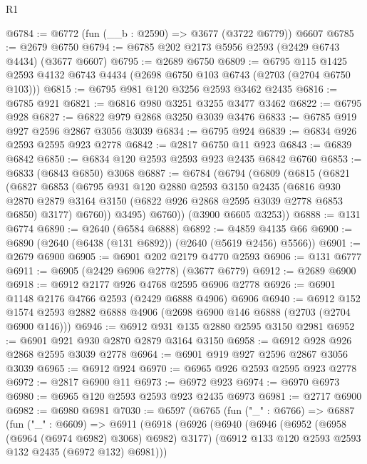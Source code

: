 \begin{lexlean}{R1}
\begin{coremodule}
@6784 := @6772 (fun (__b : @2590) => @3677 (@3722 @6779)) @6607
@6785 := @2679 @6750
@6794 := @6785 @202 @2173 @5956 @2593 (@2429 @6743 @4434) (@3677 @6607)
@6795 := @2689 @6750
@6809 := @6795
    @115
    @1425
    @2593
    @4132
    @6743
    @4434
    (@2698 @6750 @103 @6743 (@2703 (@2704 @6750 @103)))
@6815 := @6795 @981 @120 @3256 @2593 @3462 @2435
@6816 := @6785 @921
@6821 := @6816 @980 @3251 @3255 @3477 @3462
@6822 := @6795 @928
@6827 := @6822 @979 @2868 @3250 @3039 @3476
@6833 := @6785 @919 @927 @2596 @2867 @3056 @3039
@6834 := @6795 @924
@6839 := @6834 @926 @2593 @2595 @923 @2778
@6842 := @2817 @6750 @11 @923
@6843 := @6839 @6842
@6850 := @6834 @120 @2593 @2593 @923 @2435 @6842 @6760
@6853 := @6833 (@6843 @6850) @3068
@6887 := @6784
    (@6794
      (@6809
        (@6815
          (@6821
            (@6827
              @6853
              (@6795
                @931
                @120
                @2880
                @2593
                @3150
                @2435
                (@6816
                  @930
                  @2870
                  @2879
                  @3164
                  @3150
                  (@6822 @926 @2868 @2595 @3039 @2778 @6853 @6850)
                  @3177)
                @6760))
            @3495)
          @6760))
      (@3900 @6605 @3253))
@6888 := @131 @6774
@6890 := @2640 (@6584 @6888)
@6892 := @4859 @4135 @66
@6900 := @6890 (@2640 (@6438 (@131 @6892)) (@2640 (@5619 @2456) @5566))
@6901 := @2679 @6900
@6905 := @6901 @202 @2179 @4770 @2593
@6906 := @131 @6777
@6911 := @6905 (@2429 @6906 @2778) (@3677 @6779)
@6912 := @2689 @6900
@6918 := @6912 @2177 @926 @4768 @2595 @6906 @2778
@6926 := @6901 @1148 @2176 @4766 @2593 (@2429 @6888 @4906) @6906
@6940 := @6912
    @152
    @1574
    @2593
    @2882
    @6888
    @4906
    (@2698 @6900 @146 @6888 (@2703 (@2704 @6900 @146)))
@6946 := @6912 @931 @135 @2880 @2595 @3150 @2981
@6952 := @6901 @921 @930 @2870 @2879 @3164 @3150
@6958 := @6912 @928 @926 @2868 @2595 @3039 @2778
@6964 := @6901 @919 @927 @2596 @2867 @3056 @3039
@6965 := @6912 @924
@6970 := @6965 @926 @2593 @2595 @923 @2778
@6972 := @2817 @6900 @11
@6973 := @6972 @923
@6974 := @6970 @6973
@6980 := @6965 @120 @2593 @2593 @923 @2435 @6973
@6981 := @2717 @6900
@6982 := @6980 @6981
@7030 := @6597
    (@6765
      (fun ("_" : @6766) =>
      @6887
        (fun ("_" : @6609) =>
        @6911
          (@6918
            (@6926
              (@6940
                (@6946
                  (@6952 (@6958 (@6964 (@6974 @6982) @3068) @6982) @3177)
                  (@6912 @133 @120 @2593 @2593 @132 @2435 (@6972 @132) @6981)))

\end{coremodule}
\end{lexlean}

